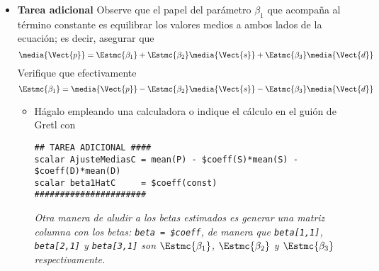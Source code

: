 \documentclass[11pt]{article}
\begin{document}
\begin{itemize}
\item \textbf{Tarea adicional} Observe que el papel del parámetro \(\beta_1\)
que acompaña al término constante es equilibrar los valores
medios a ambos lados de la ecuación; es decir, asegurar que
\[\media{\Vect{p}}=\Estmc{\beta_1}+\Estmc{\beta_2}\media{\Vect{s}}+\Estmc{\beta_3}\media{\Vect{d}}\]
Verifique que efectivamente
\[\Estmc{\beta_1}=\media{\Vect{p}}-\Estmc{\beta_2}\media{\Vect{s}}-\Estmc{\beta_3}\media{\Vect{d}}\]

\begin{itemize}
\item Hágalo empleando una calculadora o indique el cálculo en el guión de Gretl con
\begin{verbatim}
## TAREA ADICIONAL ####
scalar AjusteMediasC = mean(P) - $coeff(S)*mean(S) - $coeff(D)*mean(D)
scalar beta1HatC     = $coeff(const)
######################	 
\end{verbatim}

\emph{Otra manera de aludir a los betas estimados es generar una
matriz columna con los betas: \texttt{beta = \$coeff}, de manera que
\texttt{beta[1,1]}, \texttt{beta[2,1]} y \texttt{beta[3,1]} son \(\Estmc{\beta_1}\),
\(\Estmc{\beta_2}\) y \(\Estmc{\beta_3}\) respectivamente.}
\end{itemize}
\end{itemize}
\end{document}
